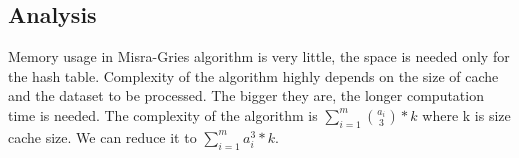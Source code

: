 \subsection{Analysis}
Memory usage in Misra-Gries algorithm is very little, the space is needed only for the hash table. Complexity of the algorithm highly depends on the size of cache and the dataset to be processed. The bigger they are, the longer computation time is needed. The complexity of the algorithm is \(\sum\limits_{i=1}^m{a_i \choose 3}*k\) where k is size cache size. We can reduce it to \(\sum\limits_{i=1}^m{a_i^3}*k\).
